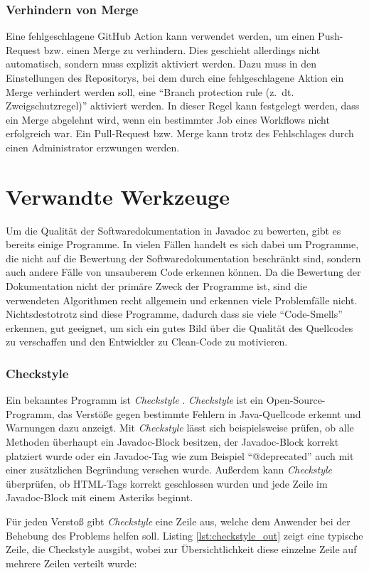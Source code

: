 \subsubsection{Verhindern von Merge}

Eine fehlgeschlagene GitHub Action kann verwendet werden, um einen Push-Request bzw.  einen Merge zu verhindern. Dies geschieht allerdings nicht automatisch, sondern muss explizit aktiviert werden. Dazu muss in den Einstellungen des Repositorys, bei dem durch eine fehlgeschlagene Aktion ein Merge verhindert werden soll, eine \enquote{Branch protection rule (z.~dt. Zweigschutzregel)} aktiviert werden. In dieser Regel kann festgelegt werden, dass ein Merge abgelehnt wird, wenn ein bestimmter Job eines Workflows nicht erfolgreich war. Ein Pull-Request bzw. Merge kann trotz des Fehlschlages durch einen Administrator erzwungen werden. 
\section{Verwandte Werkzeuge}
Um die Qualität der Softwaredokumentation in Javadoc zu bewerten, gibt es bereits einige Programme. In vielen Fällen handelt es sich dabei um Programme, die nicht auf die Bewertung der Softwaredokumentation beschränkt sind, sondern auch andere Fälle von unsauberem Code erkennen können. Da die Bewertung der Dokumentation nicht der primäre Zweck der Programme ist, sind die verwendeten Algorithmen recht allgemein und erkennen viele Problemfälle nicht. Nichtsdestotrotz sind diese Programme, dadurch dass sie viele \enquote{Code-Smells} erkennen, gut geeignet, um sich ein gutes Bild über die Qualität des Quellcodes zu verschaffen und den Entwickler zu Clean-Code zu motivieren. 
\subsubsection{Checkstyle}
\newcommand{\cs}{\textit{Checkstyle }}
Ein bekanntes Programm ist \cs \cite{Checkstyle}. \cs ist ein Open-Source-Programm, das Verstöße gegen bestimmte Fehlern in Java-Quellcode erkennt und Warnungen dazu anzeigt.   Mit \cs lässt sich beispielsweise prüfen, ob alle Methoden überhaupt ein Javadoc-Block besitzen, der Javadoc-Block korrekt platziert wurde oder ein Javadoc-Tag wie zum Beispiel \enquote{@deprecated} auch mit einer zusätzlichen Begründung versehen wurde. Außerdem kann  \cs überprüfen, ob \ac{HTML}-Tags korrekt geschlossen wurden und jede Zeile im Javadoc-Block mit einem Asteriks beginnt.


Für jeden Verstoß gibt \cs  eine Zeile aus, welche dem Anwender bei der Behebung des Problems helfen soll. Listing \ref{lst:checkstyle_out} zeigt eine typische Zeile, die Checkstyle ausgibt, wobei zur Übersichtlichkeit diese einzelne Zeile auf mehrere Zeilen verteilt wurde:

